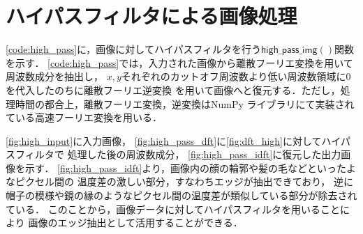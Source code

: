 \section{ハイパスフィルタによる画像処理}

\autoref{code:high_pass}に，画像に対してハイパスフィルタを行う$\mathsf{high\_pass\_img}()$関数を示す．
\autoref{code:high_pass}では，入力された画像から離散フーリエ変換を用いて周波数成分を抽出し，
$x, y$それぞれのカットオフ周波数より低い周波数領域に0を代入したのちに離散フーリエ逆変換
を用いて画像へと復元する．ただし，処理時間の都合上，離散フーリエ変換，逆変換はNumPy
ライブラリにて実装されている高速フーリエ変換を用いる．


\autoref{fig:high_input}に入力画像，
\autoref{fig:high_pass_dft}に\autoref{fig:dft_high}に対してハイパスフィルタで
処理した後の周波数成分，
\autoref{fig:high_pass_idft}に復元した出力画像を示す．
\autoref{fig:high_pass_idft}より，画像内の顔の輪郭や髪の毛などといったよなピクセル間の
温度差の激しい部分，すなわちエッジが抽出できており，
逆に帽子の模様や鏡の縁のようなピクセル間の温度差が類似している部分が除去されている．
このことから，画像データに対してハイパスフィルタを用いることにより
画像のエッジ抽出として活用することができる．

